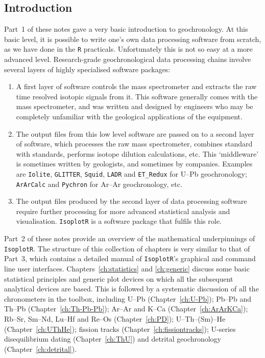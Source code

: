 \begin{refsection}

\chapter{Introduction}
\label{ch:intro2}

Part~1 of these notes gave a very basic introduction to geochronology.
At this basic level, it is possible to write one's own data processing
software from scratch, as we have done in the \texttt{R} practicals.
Unfortunately this is not so easy at a more advanced level.
Research-grade geochronological data processing chains involve several
layers of highly specialised software packages:

\begin{enumerate}
\item A first layer of software controls the mass spectrometer and
  extracts the raw time resolved isotopic signals from it. This
  software generally comes with the mass spectrometer, and was written
  and designed by engineers who may be completely unfamiliar with the
  geological applications of the equipment.
\item The output files from this low level software are passed on to a
  second layer of software, which processes the raw mass spectrometer,
  combines standard with standards, performs isotope dilution
  calculations, etc. This `middleware' is sometimes written by
  geologists, and sometimes by companies. Examples are
  \texttt{Iolite}, \texttt{GLITTER}, \texttt{Squid}, \texttt{LADR} and
  \texttt{ET\_Redux} for U--Pb geochronology; \texttt{ArArCalc} and
  \texttt{Pychron} for Ar--Ar geochronology, etc.
\item The output files produced by the second layer of data processing
  software require further processing for more advanced statistical
  analysis and visualisation. \texttt{IsoplotR} is a software package
  that fulfils this role.
\end{enumerate}

Part~2 of these notes provide an overview of the mathematical
underpinnings of \texttt{IsoplotR}. The structure of this collection
of chapters is very similar to that of Part~3, which contains a
detailed manual of \texttt{IsoplotR}'s graphical and command line user
interfaces. Chapters~\ref{ch:statistics} and \ref{ch:generic} discuss
some basic statistical principles and generic plot devices on which
all the subsequent analytical devices are based. This is followed by a
systematic discussion of all the chronometers in the toolbox,
including U--Pb (Chapter~\ref{ch:U-Pb}); Pb--Pb and Th--Pb
(Chapter~\ref{ch:Th-Pb-Pb}); Ar--Ar and K--Ca
(Chapter~\ref{ch:ArArKCa}); Rb--Sr, Sm--Nd, Lu--Hf and Re--Os
(Chapter~\ref{ch:PD}); U--Th--(Sm)--He (Chapter~\ref{ch:UThHe});
fission tracks (Chapter~\ref{ch:fissiontracks}); U-series
disequilibrium dating (Chapter~\ref{ch:ThU}) and detrital
geochronology (Chapter~\ref{ch:detrital}).

\printbibliography[heading=subbibliography]

\end{refsection}
